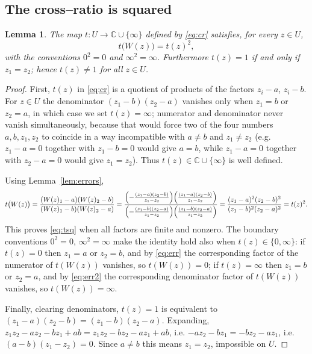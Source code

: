 \documentclass{amsart}
\newtheorem{lemma}{Lemma}
\theoremstyle{definition}
\theoremstyle{remark}
\newcommand{\C}{\mathbb{C}}
\begin{document}
\subsection{The cross--ratio is squared}

\begin{lemma}\label{lem:square}
The map $t:U\to\C\cup\{\infty\}$ defined by \eqref{eq:cr} satisfies, for every $z\in U$,
\begin{equation}\label{eq:tsq}
t\bigl(W(z)\bigr)=t(z)^2,
\end{equation}
with the conventions $0^2=0$ and $\infty^2=\infty$. Furthermore $t(z)=1$ if and only if
$z_1=z_2$; hence $t(z)\neq 1$ for all $z\in U$.
\end{lemma}

\begin{proof}
First, $t(z)$ in \eqref{eq:cr} is a quotient of products of the factors $z_i-a$, $z_i-b$.
For $z\in U$ the denominator $(z_1-b)(z_2-a)$ vanishes only when $z_1=b$ or $z_2=a$,
in which case we set $t(z)=\infty$; numerator and denominator never vanish
simultaneously, because that would force two of the four numbers $a,b,z_1,z_2$ to coincide in a
way incompatible with $a\neq b$ and $z_1\neq z_2$ (e.g.\ $z_1-a=0$ together with $z_1-b=0$
would give $a=b$, while $z_1-a=0$ together with $z_2-a=0$ would give $z_1=z_2$). Thus
$t(z)\in\C\cup\{\infty\}$ is well defined.

Using Lemma~\ref{lem:errors},
\[
t\bigl(W(z)\bigr)=
\frac{(W(z)_1-a)(W(z)_2-b)}{(W(z)_1-b)(W(z)_2-a)}
=\frac{\Bigl(-\frac{(z_1-a)(z_2-b)}{z_1-z_2}\Bigr)\Bigl(\frac{(z_1-a)(z_2-b)}{z_1-z_2}\Bigr)}
       {\Bigl(-\frac{(z_1-b)(z_2-a)}{z_1-z_2}\Bigr)\Bigl(\frac{(z_1-b)(z_2-a)}{z_1-z_2}\Bigr)}
=\frac{(z_1-a)^2(z_2-b)^2}{(z_1-b)^2(z_2-a)^2}=t(z)^2 .
\]
This proves \eqref{eq:tsq} when all factors are finite and nonzero. The boundary conventions
$0^2=0$, $\infty^2=\infty$ make the identity hold also when $t(z)\in\{0,\infty\}$: if
$t(z)=0$ then $z_1=a$ or $z_2=b$, and by \eqref{eq:err} the corresponding factor of the
numerator of $t(W(z))$ vanishes, so $t(W(z))=0$; if $t(z)=\infty$ then $z_1=b$ or $z_2=a$,
and by \eqref{eq:err2} the corresponding denominator factor of $t(W(z))$ vanishes, so
$t(W(z))=\infty$.

Finally, clearing denominators, $t(z)=1$ is equivalent to
$(z_1-a)(z_2-b)=(z_1-b)(z_2-a)$. Expanding,
$z_1z_2-az_2-bz_1+ab=z_1z_2-bz_2-az_1+ab$, i.e. $-az_2-bz_1=-bz_2-az_1$, i.e.
$(a-b)(z_1-z_2)=0$. Since $a\neq b$ this means $z_1=z_2$, impossible on $U$.
\end{proof}
\end{document}
